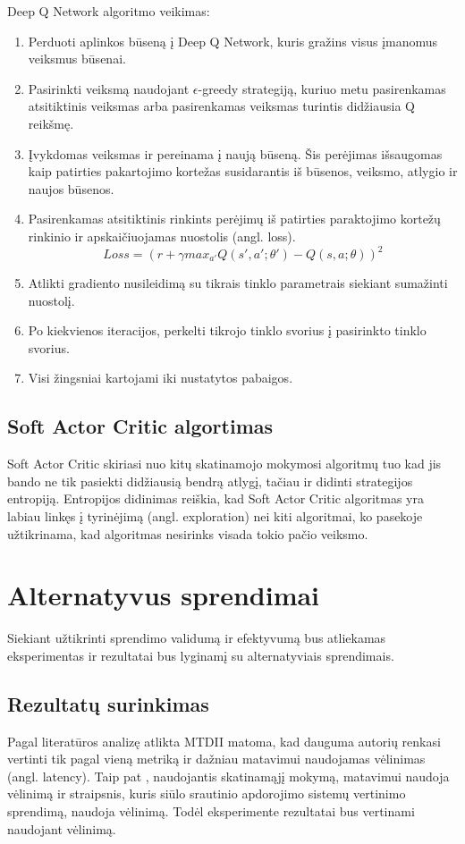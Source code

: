 \documentclass{VUMIFPSbakalaurinis}
\begin{document}
Deep Q Network algoritmo veikimas\cite{handson}:
\begin{enumerate}
    \item Perduoti aplinkos būseną į Deep Q Network, kuris gražins visus įmanomus veiksmus būsenai.
    \item Pasirinkti veiksmą naudojant \(\epsilon\)-greedy strategiją, kuriuo metu pasirenkamas atsitiktinis veiksmas arba pasirenkamas veiksmas turintis didžiausia Q reikšmę.
    \item Įvykdomas veiksmas ir pereinama į naują būseną. Šis perėjimas išsaugomas kaip patirties pakartojimo kortežas susidarantis iš būsenos, veiksmo, atlygio ir naujos būsenos.
    \item Pasirenkamas atsitiktinis rinkints perėjimų iš patirties paraktojimo kortežų rinkinio ir apskaičiuojamas nuostolis (angl. loss). \[Loss=(r + \gamma max_{a'} Q(s',a';\theta') - Q(s,a;\theta))^2\]
    \item Atlikti gradiento nusileidimą su tikrais tinklo parametrais siekiant sumažinti nuostolį.
    \item Po kiekvienos iteracijos, perkelti tikrojo tinklo svorius į pasirinkto tinklo svorius.
    \item Visi žingsniai kartojami iki nustatytos pabaigos.
\end{enumerate}
\subsection{Soft Actor Critic algortimas}
Soft Actor Critic skiriasi nuo kitų skatinamojo mokymosi algoritmų tuo kad jis bando ne tik pasiekti didžiausią bendrą atlygį, tačiau ir didinti strategijos entropiją. Entropijos didinimas reiškia, kad Soft Actor Critic algoritmas yra labiau linkęs į tyrinėjimą (angl. exploration) nei kiti algoritmai, ko pasekoje užtikrinama, kad algoritmas nesirinks visada tokio pačio veiksmo. 

\section{Alternatyvus sprendimai}
Siekiant užtikrinti sprendimo validumą ir efektyvumą bus atliekamas eksperimentas ir rezultatai bus lyginamį su alternatyviais sprendimais.

\subsection{Rezultatų surinkimas}

Pagal literatūros analizę atlikta MTDII matoma, kad dauguma autorių renkasi vertinti tik pagal vieną metriką ir dažniau matavimui naudojamas vėlinimas (angl. latency). Taip pat \cite{vaquero2018autotuning}, naudojantis skatinamąjį mokymą, matavimui naudoja vėlinimą ir \cite{Chintapalli2016Benchmarking} straipsnis, kuris siūlo srautinio apdorojimo sistemų vertinimo sprendimą, naudoja vėlinimą. Todėl eksperimente rezultatai bus vertinami naudojant vėlinimą.   
\end{document}
